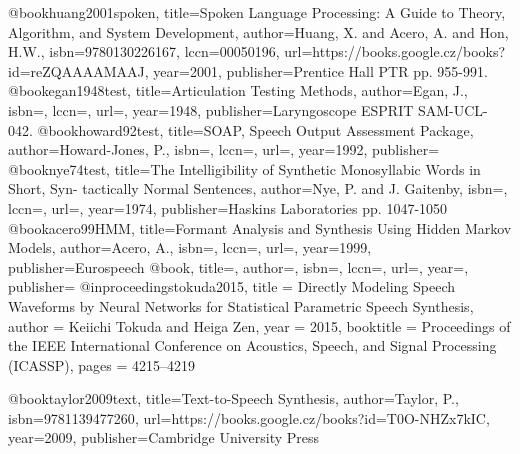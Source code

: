 

\renewcommand{\bibname}{Bibliography}




@book{huang2001spoken,
  title={Spoken Language Processing: A Guide to Theory, Algorithm, and System Development},
  author={Huang, X. and Acero, A. and Hon, H.W.},
  isbn={9780130226167},
  lccn={00050196},
  url={https://books.google.cz/books?id=reZQAAAAMAAJ},
  year={2001},
  publisher={Prentice Hall PTR}
}
pp. 955-991.
@book{egan1948test,
  title={Articulation Testing Methods},
  author={Egan, J.},
  isbn={},
  lccn={},
  url={},
  year={1948},
  publisher={Laryngoscope}
}
ESPRIT SAM-UCL-042.
@book{howard92test,
  title={SOAP, Speech Output Assessment Package},
  author={Howard-Jones, P.},
  isbn={},
  lccn={},
  url={},
  year={1992},
  publisher={}
}
@book{nye74test,
  title={The Intelligibility of Synthetic Monosyllabic Words in Short, Syn-
tactically Normal Sentences},
  author={Nye, P. and J. Gaitenby},
  isbn={},
  lccn={},
  url={},
  year={1974},
  publisher={Haskins Laboratories}
}
pp. 1047-1050
@book{acero99HMM,
  title={Formant Analysis and Synthesis Using Hidden Markov Models},
  author={Acero, A.},
  isbn={},
  lccn={},
  url={},
  year={1999},
  publisher={Eurospeech}
}
@book{,
  title={},
  author={},
  isbn={},
  lccn={},
  url={},
  year={},
  publisher={}
}
@inproceedings{tokuda2015,
title = {Directly Modeling Speech Waveforms by Neural Networks for Statistical Parametric Speech Synthesis},
author  = {Keiichi Tokuda and Heiga Zen},
year  = 2015,
booktitle = {Proceedings of the IEEE International Conference on Acoustics, Speech, and Signal Processing (ICASSP)},
pages = {4215--4219}
}

@book{taylor2009text,
  title={Text-to-Speech Synthesis},
  author={Taylor, P.},
  isbn={9781139477260},
  url={https://books.google.cz/books?id=T0O-NHZx7kIC},
  year={2009},
  publisher={Cambridge University Press}
}

